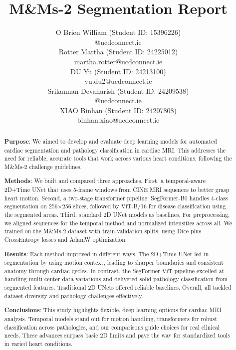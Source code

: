 \documentclass[twoside,11pt]{article}
\newcommand{\id}[1]{\textnormal{(Student ID: #1)}}
\begin{document}
  \title{M\&Ms-2 Segmentation Report}

  \author{
    \name O Brien William \id{15396226} \\
    \email @ucdconnect.ie \\
    \AND
    \name Rotter Martha \id{24225012} \\
    \email martha.rotter@ucdconnect.ie \\
    \AND
    \name DU Yu \id{24213100} \\
    \email yu.du2@ucdconnect.ie \\
    \AND
    \name Srikannan Devaharish \id{24209538} \\
    \email @ucdconnect.ie \\
    \AND
    \name XIAO Binhan \id{24207808} \\
    \email binhan.xiao@ucdconnect.ie \\
  }

  \maketitle

  \begin{abstract}%

  \textbf{Purpose}: We aimed to develop and evaluate deep learning models for automated cardiac segmentation and pathology classification in cardiac MRI. This addresses the need for reliable, accurate tools that work across various heart conditions, following the M\&Ms-2 challenge guidelines.
  
  \textbf{Methods}: We built and compared three approaches. First, a temporal-aware 2D+Time UNet that uses 5-frame windows from CINE MRI sequences to better grasp heart motion. Second, a two-stage transformer pipeline: SegFormer-B0 handles 4-class segmentation on 256×256 slices, followed by ViT-B/16 for disease classification using the segmented areas. Third, standard 2D UNet models as baselines. For preprocessing, we aligned sequences for the temporal method and normalized intensities across all. We trained on the M\&Ms-2 dataset with train-validation splits, using Dice plus CrossEntropy losses and AdamW optimization.
  
  \textbf{Results}: Each method improved in different ways. The 2D+Time UNet led in segmentation by using motion context, leading to sharper boundaries and consistent anatomy through cardiac cycles. In contrast, the SegFormer-ViT pipeline excelled at handling multi-center data variations and delivered solid pathology classification from segmented features. Traditional 2D UNets offered reliable baselines. Overall, all tackled dataset diversity and pathology challenges effectively.
  
  \textbf{Conclusions}: This study highlights flexible, deep learning options for cardiac MRI analysis. Temporal models stand out for motion handling, transformers for robust classification across pathologies, and our comparisons guide choices for real clinical needs. These advances surpass basic 2D limits and pave the way for standardized tools in varied heart conditions.
  \end{abstract}
\end{document}
